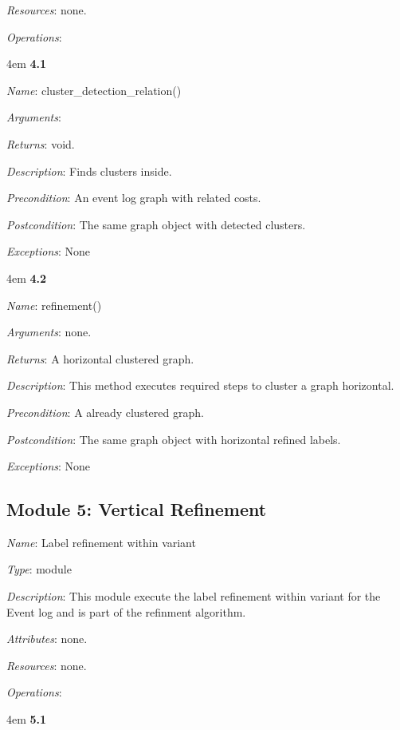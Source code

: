 \documentclass[notitlepage]{article}
\begin{document}
\begin{flushleft}
\textit{Resources}: none.

\textit{Operations}: 
\medskip

\par
\begingroup
\leftskip4em
\textbf{4.1} 

\textit{Name}: cluster\_detection\_relation()

\textit{Arguments}:  

\textit{Returns}: void.

\textit{Description}: Finds clusters inside.

\textit{Precondition}: An event log graph with related costs.

\textit{Postcondition}: The same graph object with detected clusters.

\textit{Exceptions}: None
\par
\endgroup

\medskip

\par
\begingroup
\leftskip4em
\textbf{4.2} 

\textit{Name}: refinement()

\textit{Arguments}: none.

\textit{Returns}: A horizontal clustered graph.

\textit{Description}: This method executes required steps to cluster a graph horizontal.

\textit{Precondition}: A already clustered graph.

\textit{Postcondition}: The same graph object with horizontal refined labels.

\textit{Exceptions}: None
\par
\endgroup

\subsection{Module 5: Vertical Refinement}
\textit{Name}: Label refinement within variant

\textit{Type}: module

\textit{Description}: This module execute the label refinement within variant for the Event log and is part of the refinment algorithm.

\textit{Attributes}: none.

\textit{Resources}: none.

\textit{Operations}: 
\medskip

\par
\begingroup
\leftskip4em
\textbf{5.1} 


\end{flushleft}
\end{document}
